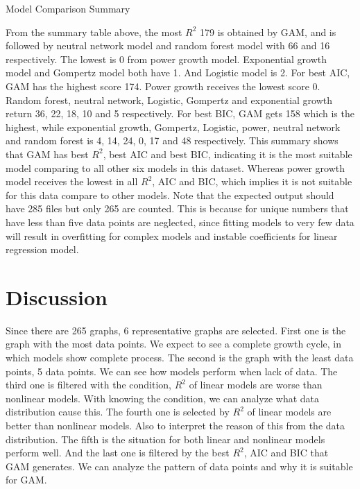 \documentclass[11pt]{article}
\begin{document}
\begin{table}[H]
    \centering 
    \caption{Model Comparison Summary}
    \label{tab:model_comparison}
\end{table}

\noindent From the summary table above, the most $R^2$ 179 is obtained by GAM, and is followed by neutral network model and random forest model with 66 and 16 respectively. The lowest is 0 from power growth model. Exponential growth model and Gompertz model both have 1. And Logistic model is 2. For best AIC, GAM has the highest score 174. Power growth receives the lowest score 0. Random forest, neutral network, Logistic, Gompertz and exponential growth return 36, 22, 18, 10 and 5 respectively. For best BIC, GAM gets 158 which is the highest, while exponential growth, Gompertz, Logistic, power, neutral network and random forest is 4, 14, 24, 0, 17 and 48 respectively. This summary shows that GAM has best $R^2$, best AIC and best BIC, indicating it is the most suitable model comparing to all other six models in this dataset. Whereas power growth model receives the lowest in all $R^2$, AIC and BIC, which implies it is not suitable for this data compare to other models. Note that the expected output should have 285 files but only 265 are counted. This is because for unique numbers that have less than five data points are neglected, since fitting models to very few data will result in overfitting for complex models and instable coefficients for linear regression model.

\section{Discussion}

Since there are 265 graphs, 6 representative graphs are selected. First one is the graph with the most data points. We expect to see a complete growth cycle, in which models show complete process. The second is the graph with the least data points, 5 data points. We can see how models perform when lack of data. The third one is filtered with the condition, $R^2$ of linear models are worse than nonlinear models. With knowing the condition, we can analyze what data distribution cause this. The fourth one is selected by $R^2$ of linear models are better than nonlinear models. Also to interpret the reason of this from the data distribution. The fifth is the situation for both linear and nonlinear models perform well. And the last one is filtered by the best $R^2$, AIC and BIC that GAM generates. We can analyze the pattern of data points and why it is suitable for GAM.
\end{document}
